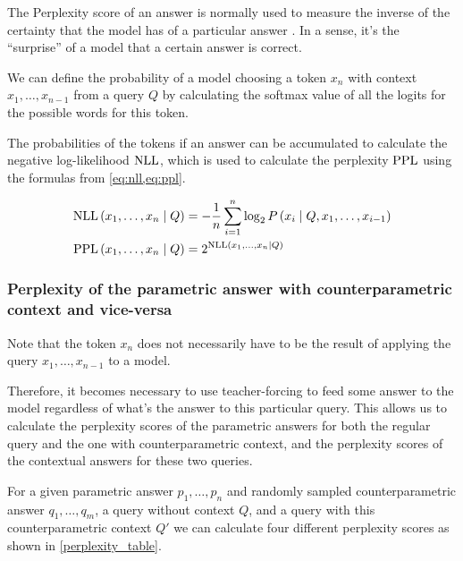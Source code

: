 The Perplexity score of an answer is normally used to measure the inverse of the certainty that the model has of a particular answer \citep{fewshotlearners,retro}.
In a sense, it's the ``surprise'' of a model that a certain answer is correct.

We can define the probability of a model choosing a token $x_n$ with context $x_1, \dots, x_{n - 1}$ from a query $Q$ by calculating the softmax value of all the logits for the possible words for this token.

The probabilities of the tokens if an answer can be accumulated to calculate the negative log-likelihood $\text{NLL}$, which is used to calculate the perplexity $\text{PPL}$ using the formulas from \cref{eq:nll,eq:ppl}.

\begin{align}
	\text{NLL} \left( x_1, \dots, x_n \mid Q \right) &= - \frac{1}{n} \sum^n_{i = 1} \log_2 P \left( x_i \mid Q, x_1, \dots, x_{i - 1} \right) \label{eq:nll} \\
	\text{PPL} \left( x_1, \dots, x_n \mid Q \right) &= {2 ^ {\text{NLL} \left( x_1, \dots, x_n \mid Q \right)}} \label{eq:ppl}
\end{align}

\newpage{}

\subsubsection{Perplexity of the parametric answer with counterparametric context and vice-versa}

Note that the token $x_n$ does not necessarily have to be the result of applying the query $x_1, \dots, x_{n - 1}$ to a model.

Therefore, it becomes necessary to use teacher-forcing \citep{teacher_forcing} to feed some answer to the model regardless of what's the answer to this particular query. This allows us to calculate the perplexity scores of the parametric answers for both the regular query and the one with counterparametric context, and the perplexity scores of the contextual answers for these two queries.

For a given parametric answer $p_1, \dots, p_n$ and randomly sampled counterparametric answer $q_1, \dots, q_m$, a query without context $Q$, and a query with this counterparametric context $Q'$ we can calculate four different perplexity scores as shown in \cref{perplexity_table}.

